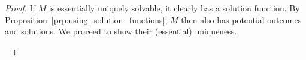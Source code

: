 \begin{proof}
  If $M$ is essentially uniquely solvable, it clearly has a solution function.
  By Proposition~\ref{prp:using_solution_functions}, $M$ then also has potential outcomes and solutions.
  We proceed to show their (essential) uniqueness.


  \begin{enumerate}

\end{enumerate}
\end{proof}
